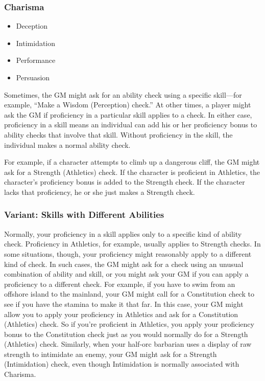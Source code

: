 \subsubsection{Charisma}

\begin{itemize}
\item Deception
\item Intimidation
\item Performance
\item Persuasion
\end{itemize}

Sometimes, the GM might ask for an ability check using a specific skill—for example, “Make a Wisdom (Perception) check.” At other times, a player might ask the GM if proficiency in a particular skill applies to a check. In either case, proficiency in a skill means an individual can add his or her proficiency bonus to ability checks that involve that skill. Without proficiency in the skill, the individual makes a normal ability check.

For example, if a character attempts to climb up a dangerous cliff, the GM might ask for a Strength (Athletics) check. If the character is proficient in Athletics, the character's proficiency bonus is added to the Strength check. If the character lacks that proficiency, he or she just makes a Strength check.

\subsubsection{Variant: Skills with Different Abilities}

Normally, your proficiency in a skill applies only to a specific kind of ability check. Proficiency in Athletics, for example, usually applies to Strength checks. In some situations, though, your proficiency might reasonably apply to a different kind of check. In such cases, the GM might ask for a check using an unusual combination of ability and skill, or you might ask your GM if you can apply a proficiency to a different check. For example, if you have to swim from an offshore island to the mainland, your GM might call for a Constitution check to see if you have the stamina to make it that far. In this case, your GM might allow you to apply your proficiency in Athletics and ask for a Constitution (Athletics) check. So if you're proficient in Athletics, you apply your proficiency bonus to the Constitution check just as you would normally do for a Strength (Athletics) check. Similarly, when your half-orc barbarian uses a display of raw strength to intimidate an enemy, your GM might ask for a Strength (Intimidation) check, even though Intimidation is normally associated with Charisma.

